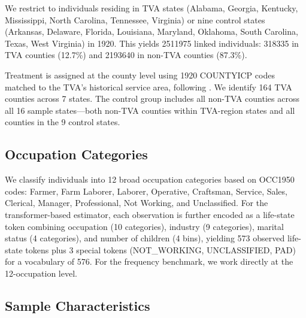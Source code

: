 \documentclass[12pt]{article}
\begin{document}
We restrict to individuals residing in TVA states (Alabama, Georgia, Kentucky, Mississippi, North Carolina, Tennessee, Virginia) or nine control states (Arkansas, Delaware, Florida, Louisiana, Maryland, Oklahoma, South Carolina, Texas, West Virginia) in 1920. This yields \num{2511975} linked individuals: \num{318335} in TVA counties (12.7\%) and \num{2193640} in non-TVA counties (87.3\%).

Treatment is assigned at the county level using 1920 COUNTYICP codes matched to the TVA's historical service area, following \citet{kline2014}. We identify 164 TVA counties across 7 states. The control group includes all non-TVA counties across all 16 sample states---both non-TVA counties within TVA-region states and all counties in the 9 control states.

\subsection{Occupation Categories}

We classify individuals into 12 broad occupation categories based on OCC1950 codes: Farmer, Farm Laborer, Laborer, Operative, Craftsman, Service, Sales, Clerical, Manager, Professional, Not Working, and Unclassified. For the transformer-based estimator, each observation is further encoded as a life-state token combining occupation (10 categories), industry (9 categories), marital status (4 categories), and number of children (4 bins), yielding 573 observed life-state tokens plus 3 special tokens (NOT\_WORKING, UNCLASSIFIED, PAD) for a vocabulary of 576. For the frequency benchmark, we work directly at the 12-occupation level.

\subsection{Sample Characteristics}
\end{document}
